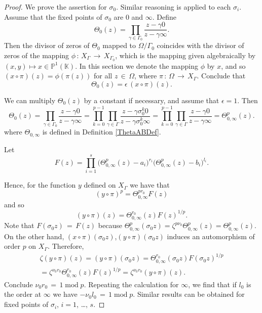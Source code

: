 \documentclass[]{amsart}
\numberwithin{equation}{section}
\DeclareMathOperator{\modOp}{mod}
\begin{document}
 \begin{proof}
 We prove the assertion for  $\sigma_0$. 
 Similar reasoning is applied to each $\sigma_i$. 
 Assume that the fixed points of $\sigma_0$ are $0$ and $\infty$. Define 
 $$\Theta_0(z)=\prod_{\gamma \in \Gamma_0}\frac{z-\gamma 0}{z- \gamma \infty}.$$ 
 Then the divisor of zeros  of $\Theta_0$ mapped to $\Omega/\Gamma_0$ coincides 
 with the divisor of zeros of the mapping $\phi \,{:}\, X_{\Gamma} \,{\to}\, X_{\Gamma_0}$, 
 which is the mapping given algebraically by $(x,y)\mapsto x\in \mathbb{P}^{1}(\mathbb{K})$.
 In this section we denote the mapping $\phi$ by $x$, and so 
$(x \circ \pi) (z) = \phi (\pi(z))$ for all $z\,{\in}\, \Omega$,
 where $\pi\,{:}\,\Omega \,{\to}\, X_{\Gamma}$.
 Conclude that
 \begin{equation}
 \Theta_0(z)= \epsilon\,  (x \circ \pi) (z).
 \end{equation}

 We can multiply $\Theta_0(z)$ by a constant if necessary, and assume that $\epsilon=1$. Then  
 \begin{equation}
\Theta_0(z)= \prod_{\gamma \in \Gamma_0}\frac{z-\gamma 0}{z- \gamma \infty}
=\prod_{k=0}^{p-1}\prod_{\gamma\in \Gamma}\frac{z-\gamma \sigma_0^k 0}{z-\gamma \sigma_0^k \infty}
=\prod_{k=0}^{p-1}\prod_{\gamma\in \Gamma}\frac{z-\gamma 0}{z-\gamma \infty}=\Theta^p_{0,\infty}(z).
 \end{equation}
 where $\Theta_{0,\infty}$ is defined in Definition \ref{ThetaABDef}.
 
 Let
 $$ F(z)= \prod_{i=1}^s
 \big(\Theta^p_{0,\infty}(z) - a_i \big)^{r_i} 
 \big(\Theta^p_{0,\infty}(z) - b_i \big)^{l_i}.$$
 
 Hence, for the function $y$ defined on $X_{\Gamma}$ we have that
 \begin{equation}
 (y\circ\pi)^p=\Theta_{0,\infty}^{p r_0} F(z)
 \end{equation}
 and so
\begin{equation}
(y\circ \pi)(z)=\Theta_{0,\infty}^{r_0}(z)F(z)^{1/p}.
 \end{equation}
Note that $F(\sigma_0z) \,{=}\, F(z)$ because  
$\Theta^p_{0,\infty}(\sigma_0 z)=\zeta^{p \nu_0}\Theta^p_{0,\infty}(z)=\Theta^p_{0,\infty}(z).$ 
On the other hand, $(x\circ \pi)(\sigma_0z)$,$(y \circ \pi)(\sigma_0z)$ 
induces an automorphism of order $p$ on $X_{\Gamma}$. Therefore,
\begin{multline}
\zeta (y\circ\pi)(z) = (y\circ \pi)(\sigma_0 z) = 
\Theta^{r_0}_{0,\infty}(\sigma_0 z) F(\sigma_0 z)^{1/p} \\
= \zeta^{\nu_0 r_0}\Theta^{r_0}_{0,\infty}(z)F(z)^{1/p} 
= \zeta^{\nu_0 r_0} (y\circ \pi)(z).
\end{multline}
Conclude $\nu_0 r_0 \,{=}\,1\modOp p$. Repeating the calculation for $\infty$, we find  that 
if $l_0$ is the order at $\infty$ we have ${-}\nu_0 l_0 \,{=}\,1\modOp p$. 
Similar results can be obtained for fixed points of $\sigma_i$, $i=1$, \ldots, $s$.
 \end{proof}
 
\end{document}
